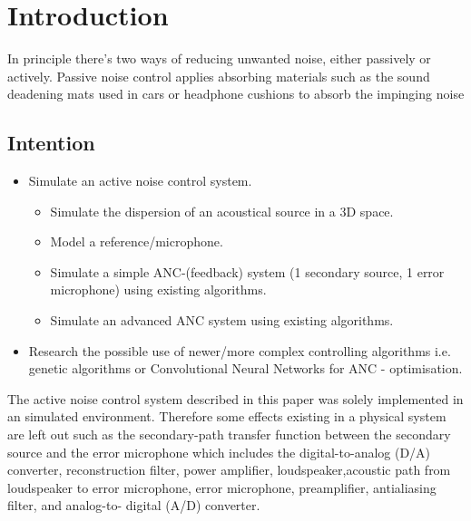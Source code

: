 \chapter{Introduction}
\label{chap:introduction}

In principle there's two ways of reducing unwanted noise, either passively or actively. Passive noise control applies absorbing materials such as the sound deadening mats used in cars or headphone cushions to absorb the impinging noise 

\section{Intention}
    \begin{itemize}
        \item Simulate an active noise control system. 
    \begin{itemize}
        \item Simulate the dispersion of an acoustical source in a 3D space.
        \item Model a reference/microphone.
        \item Simulate a simple ANC-(feedback) system (1 secondary source, 1 error microphone) using existing algorithms.
        \item Simulate an advanced ANC system using existing algorithms.
    \end{itemize}
        \item Research the possible use of newer/more complex controlling algorithms i.e. genetic algorithms or Convolutional Neural Networks for ANC - optimisation.
\end{itemize}


The active noise control system described in this paper was solely implemented in an simulated environment. Therefore some effects existing in a physical system are left out such as the secondary-path transfer function between the secondary source and the error microphone which includes the digital-to-analog (D/A) converter, reconstruction filter, power amplifier, loudspeaker,acoustic path from loudspeaker to error microphone, error microphone, preamplifier, antialiasing filter, and analog-to- digital (A/D) converter.\cite{Kuo1999}


